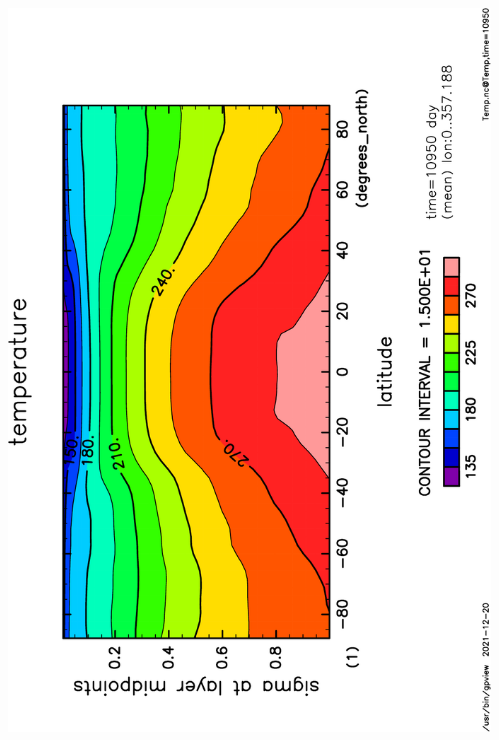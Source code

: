 \documentclass[aspectratio=149,9pt,fleqn]{beamer}
\begin{document}
\begin{frame}
\begin{columns}[T]
\begin{column}{.4\textwidth}
		\end{column}
		\begin{column}{.4\textwidth}
			\includegraphics[height=\textwidth,angle=-90]{S1366Temp,time=10950-crop.pdf}
		\end{column}
	\end{columns}
\end{frame}
\end{document}

